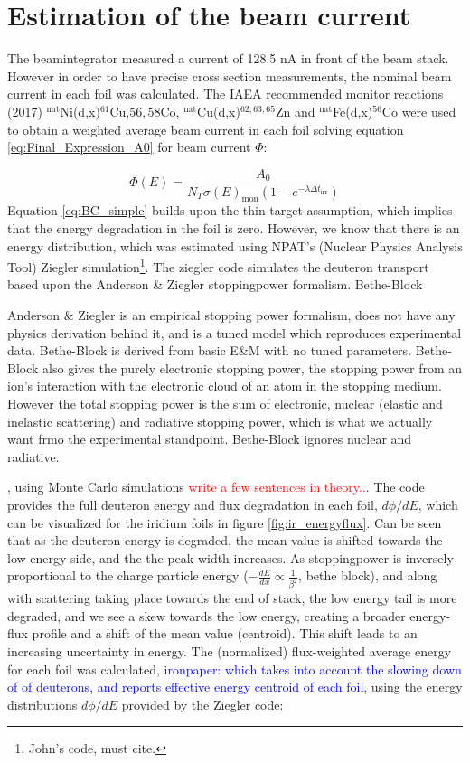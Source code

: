 \section{Estimation of the beam current}
The beamintegrator measured a current of 128.5 nA in front of the beam stack. However in order to have precise cross section measurements, the nominal beam current in each foil was calculated. The IAEA recommended monitor reactions (2017) $^\text{nat}$Ni(d,x)$^{61}$Cu,$56,58$Co, $^\text{nat}$Cu(d,x)$^{62,63,65}$Zn and $^\text{nat}$Fe(d,x)$^{56}$Co \cite{Hermanne2018a} were used to obtain a weighted average beam current in each foil solving equation \ref{eq:Final_Expression_A0} for beam current $\Phi$:

\begin{equation} \label{eq:BC_simple}
    \Phi(E) = \frac{A_0}{N_T \sigma(E)_\text{mon}(1-e^{-\lambda \Delta t_\text{irr}})}
\end{equation}
\noindent 
Equation \ref{eq:BC_simple} builds upon the thin target assumption, which implies that the energy degradation in the foil is zero. However, we know that there is an energy distribution, which was estimated using NPAT's (Nuclear Physics Analysis Tool) Ziegler simulation\footnote{John's code, must cite.}. The ziegler code simulates the deuteron transport based upon the Anderson \& Ziegler stoppingpower formalism. Bethe-Block 

Anderson \& Ziegler is an empirical stopping power formalism, does not have any physics derivation behind it, and is a tuned model which reproduces experimental data. Bethe-Block is derived from basic E\&M with no tuned parameters. Bethe-Block also gives the purely electronic stopping power, the stopping power from an ion's interaction with the electronic cloud of an atom in the stopping medium. However the total stopping power is the sum of electronic, nuclear (elastic and inelastic scattering) and radiative stopping power, which is what we actually want frmo the experimental standpoint. Bethe-Block ignores nuclear and radiative. 



, using Monte Carlo simulations \textcolor{red}{write a few sentences in theory..}. The code provides the full deuteron energy and flux degradation in each foil, $d\phi/dE$, which can be visualized for the iridium foils in figure \ref{fig:ir_energyflux}.  Can be seen that as the deuteron energy is degraded, the mean value is shifted towards the low energy side, and the the peak width increases. As stoppingpower is inversely proportional to the charge particle energy ($-\frac{dE}{dx}\propto \frac{1}{\beta^2}$, bethe block), and along with scattering taking place towards the end of stack, the low energy tail is more degraded, and we see a skew towards the low energy, creating a broader energy-flux profile and a shift of the mean value (centroid). This shift leads to an increasing uncertainty in energy. The (normalized) flux-weighted average energy for each foil was calculated, \textcolor{blue}{ironpaper: which takes into account the slowing down of of deuterons, and reports effective energy centroid of each foil}, using the energy distributions $d\phi/dE$ provided by the Ziegler code:

